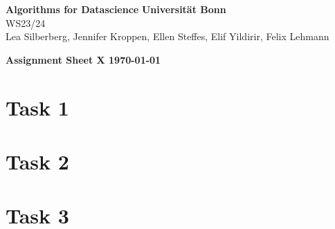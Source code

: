 \documentclass[DIN, pagenumber=false, fontsize=11pt, parskip=half]{scrartcl}
\renewcommand{\title}[1]{{\noindent\Large\textbf{#1}}}
\begin{document}
\noindent\textbf{Algorithms for Datascience} \hfill \textbf{Universität Bonn}\\
WS23/24 \hfill \\
Lea Silberberg, Jennifer Kroppen, Ellen Steffes, Elif Yildirir, Felix Lehmann 

\title{Assignment Sheet X \hfill \today}

\section*{Task 1}

\section*{Task 2}

\section*{Task 3}
\end{document}
